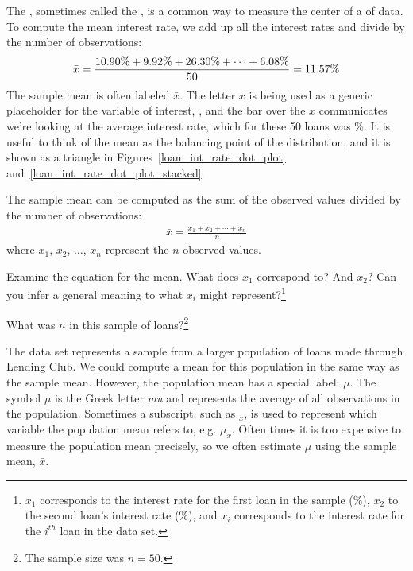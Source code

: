 The , sometimes called the
, is a common way
to measure the center of a  of data.
To compute the mean interest rate, we add up all the interest
rates and divide by the number of observations:
\begin{align*}
\bar{x}
    = \frac{\text{10.90\%} + \text{9.92\%} + \text{26.30\%} +
        \cdots + \text{6.08\%}}{50{}}
    = 11.57{}\%
\end{align*}
The sample mean is often labeled $\bar{x}$.
The letter $x$ is being used as a generic placeholder
for the variable of interest, ,
and the bar over the $x$ communicates we're looking at the
average interest rate, which for these 50 loans was \loanAvg{}\%.
It is useful to think of the mean as the balancing point
of the distribution, and it is shown as a triangle in Figures~\ref{loan_int_rate_dot_plot}
and~\ref{loan_int_rate_dot_plot_stacked}.

\begin{termBox}{%
The sample mean can be computed as the sum of the
observed values divided by the number of observations:
\begin{align*}
\bar{x} = \frac{x_1 + x_2 + \cdots + x_n}{n}
\end{align*}
where $x_1$, $x_2$, $\dots$, $x_n$ represent
the $n$ observed values.}
\end{termBox}

\begin{exercise}
Examine the equation for the mean.
What does $x_1$ correspond to? And $x_2$?
Can you infer a general meaning to what $x_i$
might represent?\footnote{$x_1$ corresponds to the
  interest rate for the first loan in the sample (\loanA\%),
  $x_2$ to the second loan's interest rate (\loanB\%),
  and $x_i$ corresponds to the interest rate for the
  $i^{th}$ loan in the data set.}
\end{exercise}

\begin{exercise}
What was $n$ in this sample of
loans?\footnote{The sample size was $n = 50$.}
\end{exercise}

The  data set represents a sample from
a larger population of loans made through Lending Club.
We could compute a mean for this population in the same way
as the sample mean.
However, the population mean has a special label: $\mu$.
The symbol $\mu$ is the Greek letter \emph{mu} and represents
the average of all observations in the population.
Sometimes a subscript, such as $_x$,
is used to represent which variable the population mean
refers to, e.g. $\mu_x$.
Often times it is too expensive to measure the
population mean precisely, so we often estimate
$\mu$ using the sample mean, $\bar{x}$.


